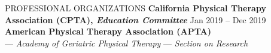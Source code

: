 \documentclass{resume} %
\begin{document}







\begin{rSection}{PROFESSIONAL ORGANIZATIONS}
\textbf{California Physical Therapy Association (CPTA), \textit{Education Committee}} \hfill{Jan 2019 -- Dec 2019}
~\\
\textbf{American Physical Therapy Association (APTA)}\\
\-\hspace{5mm} --- \textit{Academy of Geriatric Physical Therapy}
\-\hspace{5mm} --- \textit{Section on Research}
\end{rSection} 


\end{document}
